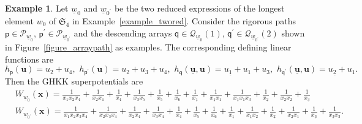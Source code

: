 \documentclass[11pt]{amsart}
\theoremstyle{plain}
\theoremstyle{definition}
\newtheorem{example}[theorem]{Example}
\theoremstyle{remark}
\numberwithin{equation}{section} \numberwithin{table}{section}
\numberwithin{equation}{section}
\begin{document}
\begin{example}\label{example_GHKKsuperpo}
Let $\underline{w}_0$ and $\underline{w}_{0^\prime}$ be the two reduced expressions of the longest element $w_0$ of $\mathfrak{S}_4$ in Example~\ref{example_twored}. Consider the rigorous paths $\mathsf{p}\in\mathcal{P}_{\underline{w}_0}$, $\mathsf{p}^\prime \in \mathcal{P}_{\underline{w}_{0^\prime}}$ and the descending arrays $\mathsf{q} \in \mathcal{Q}_{\underline{w}_0}(1)$, $\mathsf{q}^\prime \in \mathcal{Q}_{\underline{w}_{0^\prime}}(2)$ shown in Figure~\ref{figure_arraypath} as examples. The corresponding defining linear functions are
$$
h_{\mathsf{p}}(\mathbf{u}) =u_2 + u_4, \,\, h_{\mathsf{p}^\prime}(\mathbf{u}) = u_2 + u_3 + u_4, \,\, h_{\mathsf{q}}(\underline{\mathbf{u}}, \mathbf{u}) = u_{\underline{1}} + u_1 + u_3,   \,\, h_{\mathsf{q}^\prime}(\underline{\mathbf{u}}, \mathbf{u}) = u_{\underline{2}} + u_1. 
$$
Then the GHKK superpotentials are
{\small
\begin{align*}
&W_{\underline{w}_0}(\mathbf{x}) = \frac{1}{x_1x_2x_4} + \frac{1}{x_2x_4} + \frac{1}{x_4} + \frac{1}{x_3x_5} + \frac{1}{x_5} + \frac{1}{x_6} + \frac{1}{x_{\underline{1}}} + \frac{1}{x_{\underline{1}}x_1} + \frac{1}{x_{\underline{1}}x_1x_3} +  \frac{1}{x_{\underline{2}}} + \frac{1}{x_{\underline{2}}x_2} +  \frac{1}{x_{\underline{3}}}
\\ 
&W_{\underline{w}_{0^\prime}}(\mathbf{x}) = \frac{1}{x_1x_2x_3x_4}  + \frac{1}{x_2x_3x_4} + \frac{1}{x_2x_4} + \frac{1}{x_3x_4} + \frac{1}{x_4} + \frac{1}{x_5} + \frac{1}{x_6} + \frac{1}{x_{\underline{1}}} + \frac{1}{x_{\underline{1}}x_2} +  \frac{1}{x_{\underline{2}}} +  \frac{1}{x_{\underline{2}}x_1} + \frac{1}{x_{\underline{3}}} +  \frac{1}{x_{\underline{3}}x_3}.
\end{align*}
}
\begin{figure}[h]
\centering
{}
\end{figure}
\end{example}
\end{document}
